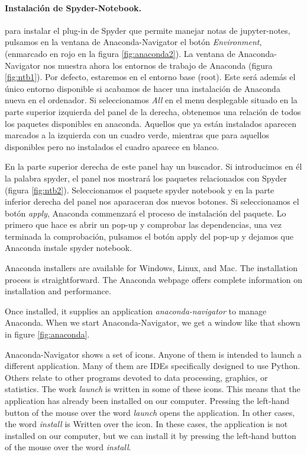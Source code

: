 \begin{paracol}{2}
 \paragraph{Instalación de Spyder-Notebook.} para instalar el plug-in de Spyder que permite manejar notas de jupyter-notes, pulsamos en la ventana de Anaconda-Navigator el botón \emph{Environment}, (enmarcado en rojo en la figura \ref{fig:anaconda2}). La ventana de Anaconda-Navigator nos muestra ahora los entornos de trabajo de Anaconda (figura \ref{fig:ntb1}). Por defecto, estaremos en el entorno base (root). Este será además el único entorno disponible si acabamos de hacer una instalación de Anaconda nueva en el ordenador. Si seleccionamos \emph{All} en el menu desplegable situado en la parte superior izquierda del panel de la derecha,  obtenemos una relación de todos los paquetes disponibles en anaconda. Aquellos que ya están instalados aparecen marcados a la izquierda con un cuadro verde, mientras que para aquellos disponibles pero no instalados el cuadro aparece en blanco.

 En la parte superior derecha de este panel hay un buscador. Si introducimos en él la palabra spyder, el panel nos mostrará los paquetes relacionados con Spyder (figura \ref{fig:ntb2}). Seleccionamos el paquete spyder notebook y en la parte inferior derecha del panel nos aparaceran dos nuevos botones. Si seleccionamos el botón \emph{apply}, Anaconda commenzará el proceso de instalación del paquete. Lo primero que hace es abrir un pop-up y comprobar las dependencias, una vez terminada la comprobación, pulsamos el botón apply del pop-up y dejamos que Anaconda instale spyder notebook.
 

 \switchcolumn
 Anaconda installers are available for Windows, Linux, and Mac. The installation process is straightforward. The Anaconda webpage offers complete information on installation and performance.

 Once installed, it supplies an application \emph{anaconda-navigator} to manage Anaconda. When we start Anaconda-Navigator, we get a window like that shown in figure \ref{fig:anaconda}.

 Anaconda-Navigator shows a set of icons. Anyone of them is intended to launch a different application. Many of them are IDEs specifically designed to use Python. Others relate to other programs devoted to data processing, graphics, or statistics. The work \emph{launch} is written in some of these icons. This means that the application has already been installed on our computer. Pressing the left-hand button of the mouse over the word \emph{launch} opens the application. In other cases, the word \emph{install} is Written over the icon. In these cases, the application is not installed on our computer, but we can install it by pressing the left-hand button of the mouse over the word \emph{install}.


\end{paracol}
